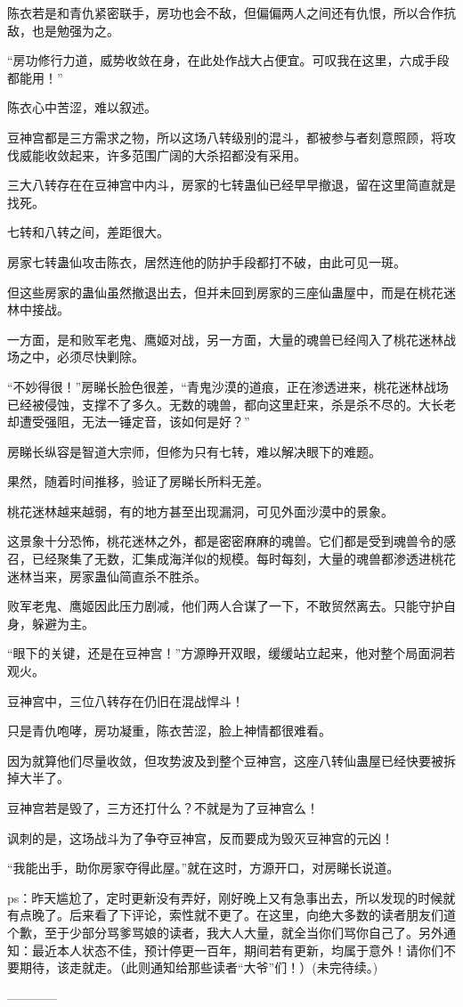 \begin{this_body}
陈衣若是和青仇紧密联手，房功也会不敌，但偏偏两人之间还有仇恨，所以合作抗敌，也是勉强为之。

“房功修行力道，威势收敛在身，在此处作战大占便宜。可叹我在这里，六成手段都能用！”

陈衣心中苦涩，难以叙述。

豆神宫都是三方需求之物，所以这场八转级别的混斗，都被参与者刻意照顾，将攻伐威能收敛起来，许多范围广阔的大杀招都没有采用。

三大八转存在在豆神宫中内斗，房家的七转蛊仙已经早早撤退，留在这里简直就是找死。

七转和八转之间，差距很大。

房家七转蛊仙攻击陈衣，居然连他的防护手段都打不破，由此可见一斑。

但这些房家的蛊仙虽然撤退出去，但并未回到房家的三座仙蛊屋中，而是在桃花迷林中接战。

一方面，是和败军老鬼、鹰姬对战，另一方面，大量的魂兽已经闯入了桃花迷林战场之中，必须尽快剿除。

“不妙得很！”房睇长脸色很差，“青鬼沙漠的道痕，正在渗透进来，桃花迷林战场已经被侵蚀，支撑不了多久。无数的魂兽，都向这里赶来，杀是杀不尽的。大长老却遭受强阻，无法一锤定音，该如何是好？”

房睇长纵容是智道大宗师，但修为只有七转，难以解决眼下的难题。

果然，随着时间推移，验证了房睇长所料无差。

桃花迷林越来越弱，有的地方甚至出现漏洞，可见外面沙漠中的景象。

这景象十分恐怖，桃花迷林之外，都是密密麻麻的魂兽。它们都是受到魂兽令的感召，已经聚集了无数，汇集成海洋似的规模。每时每刻，大量的魂兽都渗透进桃花迷林当来，房家蛊仙简直杀不胜杀。

败军老鬼、鹰姬因此压力剧减，他们两人合谋了一下，不敢贸然离去。只能守护自身，躲避为主。

“眼下的关键，还是在豆神宫！”方源睁开双眼，缓缓站立起来，他对整个局面洞若观火。

豆神宫中，三位八转存在仍旧在混战悍斗！

只是青仇咆哮，房功凝重，陈衣苦涩，脸上神情都很难看。

因为就算他们尽量收敛，但攻势波及到整个豆神宫，这座八转仙蛊屋已经快要被拆掉大半了。

豆神宫若是毁了，三方还打什么？不就是为了豆神宫么！

讽刺的是，这场战斗为了争夺豆神宫，反而要成为毁灭豆神宫的元凶！

“我能出手，助你房家夺得此屋。”就在这时，方源开口，对房睇长说道。

ps：昨天尴尬了，定时更新没有弄好，刚好晚上又有急事出去，所以发现的时候就有点晚了。后来看了下评论，索性就不更了。在这里，向绝大多数的读者朋友们道个歉，至于少部分骂爹骂娘的读者，我大人大量，就全当你们骂你自己了。另外通知：最近本人状态不佳，预计停更一百年，期间若有更新，均属于意外！请你们不要期待，该走就走。（此则通知给那些读者“大爷”们！）(未完待续。)

------------

\end{this_body}

